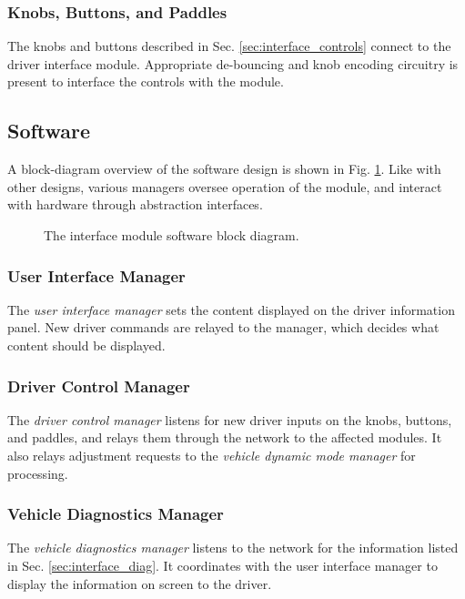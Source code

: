\subsubsection{Knobs, Buttons, and Paddles}

The knobs and buttons described in Sec. \ref{sec:interface_controls} connect to the driver interface module. Appropriate de-bouncing and knob encoding circuitry is present to interface the controls with the module. 

\subsection{Software}

A block-diagram overview of the software design is shown in Fig. \ref{fig:interface_software_design_block}. Like with other designs, various managers oversee operation of the module, and interact with hardware through abstraction interfaces.

\begin{figure}[H]
	\centering
%	
	\caption{The interface module software block diagram.}
	\label{fig:interface_software_design_block}
\end{figure}

\subsubsection{User Interface Manager}

The \emph{user interface manager} sets the content displayed on the driver information panel. New driver commands are relayed to the manager, which decides what content should be displayed. 

\subsubsection{Driver Control Manager}

The \emph{driver control manager} listens for new driver inputs on the knobs, buttons, and paddles, and relays them through the network to the affected modules. It also relays adjustment requests to the \emph{vehicle dynamic mode manager} for processing.

\subsubsection{Vehicle Diagnostics Manager}

The \emph{vehicle diagnostics manager} listens to the network for the information listed in Sec. \ref{sec:interface_diag}. It coordinates with the user interface manager to display the information on screen to the driver.

